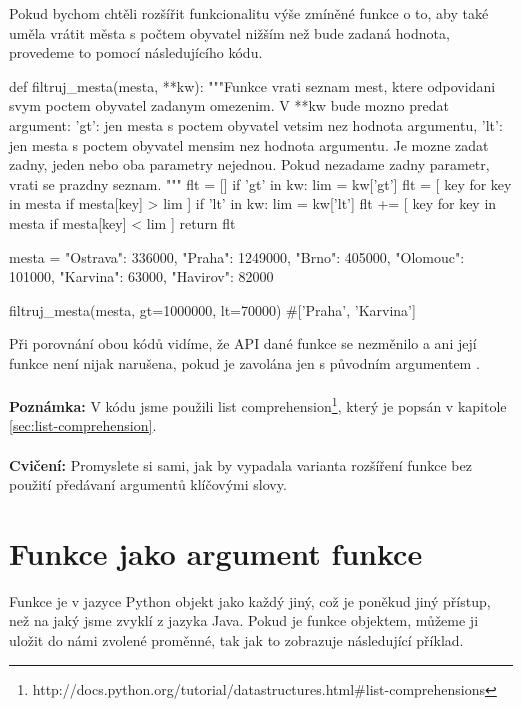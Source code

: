 Pokud bychom chtěli rozšířit funkcionalitu výše zmíněné funkce o to, aby také uměla vrátit města
s počtem obyvatel nižším než bude zadaná hodnota, provedeme to pomocí následujícího kódu.

\begin{python}
def filtruj_mesta(mesta, **kw):
    """Funkce vrati seznam mest, ktere odpovidani svym
    poctem obyvatel zadanym omezenim.
    V **kw bude mozno predat argument:
     'gt': jen mesta s poctem obyvatel vetsim nez hodnota argumentu,
     'lt': jen mesta s poctem obyvatel mensim nez hodnota argumentu.
    Je mozne zadat zadny, jeden nebo oba parametry nejednou.
    Pokud nezadame zadny parametr, vrati se prazdny seznam.
    """
    flt = []
    if 'gt' in kw:
        lim = kw['gt']
        flt = [ key for key in mesta if mesta[key] > lim ]
    if 'lt' in kw:
        lim = kw['lt']
        flt += [ key for key in mesta if mesta[key] < lim ]
    return flt

mesta = {"Ostrava": 336000, "Praha": 1249000,
         "Brno": 405000, "Olomouc": 101000,
         "Karvina": 63000, "Havirov": 82000}

filtruj_mesta(mesta, gt=1000000, lt=70000)
#['Praha', 'Karvina']
\end{python}

Při porovnání obou kódů vidíme, že API dané funkce se nezměnilo a ani její funkce není nijak narušena,
pokud je zavolána jen s původním argumentem .
\\
\\
\noindent
{\textbf{Poznámka:}}
V kódu jsme použili list comprehension\footnote{http://docs.python.org/tutorial/datastructures.html\#list-comprehensions}, který je popsán v kapitole \ref{sec:list-comprehension}.
\\
\\
\noindent
{\textbf{Cvičení:}}
Promyslete si sami, jak by vypadala varianta
rozšíření funkce bez použití předávaní argumentů klíčovými slovy.


\section{Funkce jako argument funkce}

Funkce je v jazyce Python objekt jako každý jiný, což je poněkud jiný přístup, než na jaký jsme zvyklí
z jazyka Java. Pokud je funkce objektem, můžeme ji uložit do námi zvolené proměnné, tak jak to zobrazuje
následující příklad.


